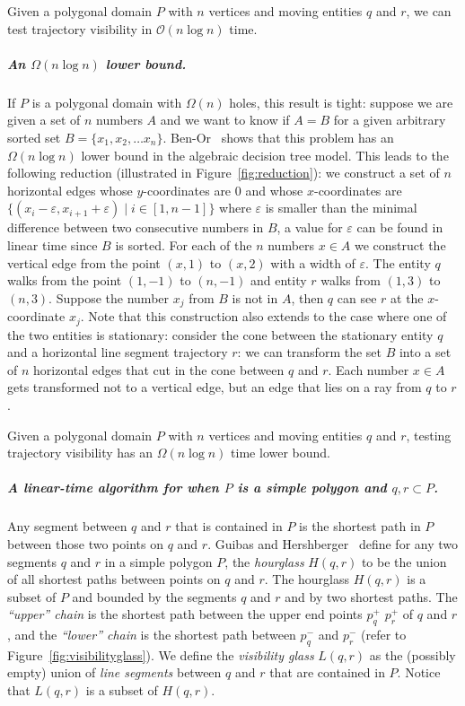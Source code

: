 \documentclass[UKenglish]{lipics-v2019}
\begin{document}
\begin{theorem}
  \label{thm:algorithm_general}
  Given a polygonal domain $P$ with $n$ vertices and moving entities $q$ and $r$, we can test trajectory visibility in $\mathcal{O}(n \log n)$ time.
\end{theorem}

\subparagraph{An $\Omega(n \log n)$ lower bound.}
If $P$ is a polygonal domain with $\Omega(n)$ holes, this result is tight: suppose we are given a set of $n$ numbers $A$ and we want to know if $A = B$ for a given arbitrary sorted set $B = \{x_1,x_2, \ldots x_n \}$. 
Ben-Or~\cite{ben1983lower} shows that this problem has an $\Omega(n \log n)$ lower bound in the algebraic decision tree model. 
This leads to the following reduction (illustrated in Figure~\ref{fig:reduction}): we construct a set of $n$ horizontal edges whose $y$-coordinates are $0$ and whose $x$-coordinates are $\{ (x_{i} - \varepsilon, x_{i+1} + \varepsilon ) \mid i \in [1, n-1] \}$ where $\varepsilon$ is smaller than the minimal difference between two consecutive numbers in $B$, a value for $\varepsilon$ can be found in linear time since $B$ is sorted.
For each of the $n$ numbers $x \in A$ we construct the vertical edge from the point $(x, 1)$ to $(x,2)$ with a width of $\varepsilon$. 
The entity $q$ walks from the point $(1,-1)$ to $(n, -1)$ and entity $r$ walks from $(1,3)$ to $(n, 3)$. 
Suppose the number $x_j$ from $B$ is not in $A$, then $q$ can see $r$ at the $x$-coordinate $x_j$. 
Note that this construction also extends to the case where one of the two entities is stationary: consider the cone between the stationary entity $q$ and a horizontal line segment trajectory $r$: we can transform the set $B$ into a set of $n$ horizontal edges that cut in the cone between $q$ and $r$. 
Each number $x \in A$ gets transformed not to a vertical edge, but an edge that lies on a ray from $q$ to $r$.



\begin{theorem}
    Given a polygonal domain $P$ with $n$ vertices and moving entities $q$ and $r$, testing trajectory visibility has an $\Omega(n \log n)$ time lower bound.
\end{theorem}


\subparagraph{A linear-time algorithm for when $P$ is a simple polygon and
  $q,r \subset P$.}  Any segment between $q$ and $r$ that is contained in $P$
is the shortest path in $P$ between those two points on $q$ and $r$. Guibas and
Hershberger~\cite{guibas1989optimal} define for any two segments $q$ and $r$ in
a simple polygon $P$, the \emph{hourglass} $H(q,r)$ to be the union of all
shortest paths between points on $q$ and $r$. The hourglass $H(q,r)$ is a subset of $P$
and bounded by the segments $q$ and $r$ and by two shortest paths.
The {\em ``upper'' chain} is the shortest path between the upper end points $p_q^+$ $p_r^+$ of $q$ and $r$,
and the {\em ``lower'' chain} is the shortest path between $p_q^-$ and $p_r^-$ (refer to Figure~\ref{fig:visibilityglass}). 
We define the \emph{visibility glass} $L(q,r)$ as the (possibly
empty) union of \emph{line segments} between $q$ and $r$ that are
contained in $P$. Notice that $L(q,r)$ is a subset of $H(q,r)$.
 
\end{document}
